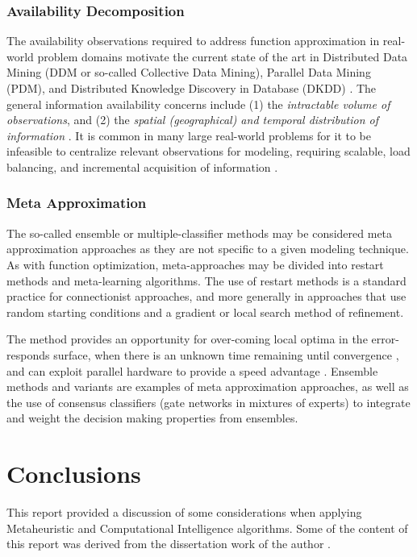 \documentclass[a4paper, 11pt]{article}
\begin{document}
\subsubsection{Availability Decomposition}
The availability observations required to address function approximation in real-world problem domains motivate the current state of the art in Distributed Data Mining (DDM or so-called Collective Data Mining), Parallel Data Mining (PDM), and Distributed Knowledge Discovery in Database (DKDD) \cite{Kargupta2000}. The general information availability concerns include (1) the \emph{intractable volume of observations}, and (2) the \emph{spatial (geographical) and temporal distribution of information} \cite{Zaki1999}. It is common in many large real-world problems for it to be infeasible to centralize relevant observations for modeling, requiring scalable, load balancing, and incremental acquisition of information \cite{Skillicorn1999}. 
	
\subsubsection{Meta Approximation}
The so-called ensemble or multiple-classifier methods may be considered meta approximation approaches as they are not specific to a given modeling technique. As with function optimization, meta-approaches may be divided into restart methods and meta-learning algorithms. The use of restart methods is a standard practice for connectionist approaches, and more generally in approaches that use random starting conditions and a gradient or local search method of refinement. 

The method provides an opportunity for over-coming local optima in the error-responds surface, when there is an unknown time remaining until convergence \cite{Magdon-ismail2000}, and can exploit parallel hardware to provide a speed advantage \cite{Blas2005}. Ensemble methods and variants are examples of meta approximation approaches, as well as the use of consensus classifiers (gate networks in mixtures of experts) to integrate and weight the decision making properties from ensembles. 



\section{Conclusions}
\label{sec:conclusions}
This report provided a discussion of some considerations when applying Metaheuristic and Computational Intelligence algorithms.
Some of the content of this report was derived from the dissertation work of the author \cite{Brownlee2008}.



\end{document}
